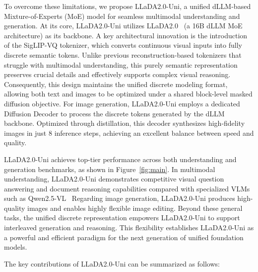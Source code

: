 To overcome these limitations, we propose LLaDA2.0-Uni, a unified dLLM-based Mixture-of-Experts (MoE) model for seamless multimodal understanding and generation.
%
At its core, LLaDA2.0-Uni utilizes LLaDA2.0~\citep{LLaDA2} (a 16B dLLM MoE architecture) as its backbone.
%
A key architectural innovation is the introduction of the SigLIP-VQ tokenizer, which converts continuous visual inputs into fully discrete semantic tokens.
%
Unlike previous reconstruction-based tokenizers that struggle with multimodal understanding, this purely semantic representation preserves crucial details and effectively supports complex visual reasoning.
%
Consequently, this design maintains the unified discrete modeling format, allowing both text and images to be optimized under a shared block-level masked diffusion objective.
%
For image generation, LLaDA2.0-Uni employs a dedicated Diffusion Decoder to process the discrete tokens generated by the dLLM backbone.
%
Optimized through distillation, this decoder synthesizes high-fidelity images in just 8 inference steps, achieving an excellent balance between speed and quality.

LLaDA2.0-Uni achieves top-tier performance across both understanding and generation benchmarks, as shown in Figure~\ref{fig:main}.
%
In multimodal understanding, LLaDA2.0-Uni demonstrates competitive visual question answering and document reasoning capabilities compared with specialized VLMs such as Qwen2.5-VL~\citep{bai2025qwen2}
%
Regarding image generation, LLaDA2.0-Uni produces high-quality images and enables highly flexible image editing.
%
Beyond these general tasks, the unified discrete representation empowers LLaDA2.0-Uni to support interleaved generation and reasoning.
%
This flexibility establishes LLaDA2.0-Uni as a powerful and efficient paradigm for the next generation of unified foundation models.


The key contributions of LLaDA2.0-Uni can be summarized as follows:

